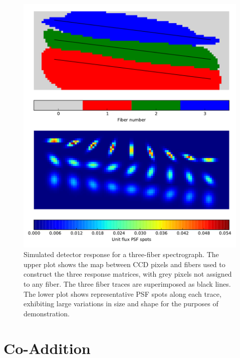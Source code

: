 \documentclass[12pt]{article}
\begin{document}
\begin{figure}[htb]
\begin{center}
\includegraphics[width=5in]{fig/detector}
\caption{Simulated detector response for a three-fiber spectrograph. The upper plot shows the map between CCD pixels and fibers used to construct the three response matrices, with grey pixels not assigned to any fiber. The three fiber traces are superimposed as black lines. The lower plot shows representative PSF spots along each trace, exhibiting large variations in size and shape for the purposes of demonstration.}
\label{fig:detector}
\end{center}
\end{figure}

\section{Co-Addition}
\end{document}
